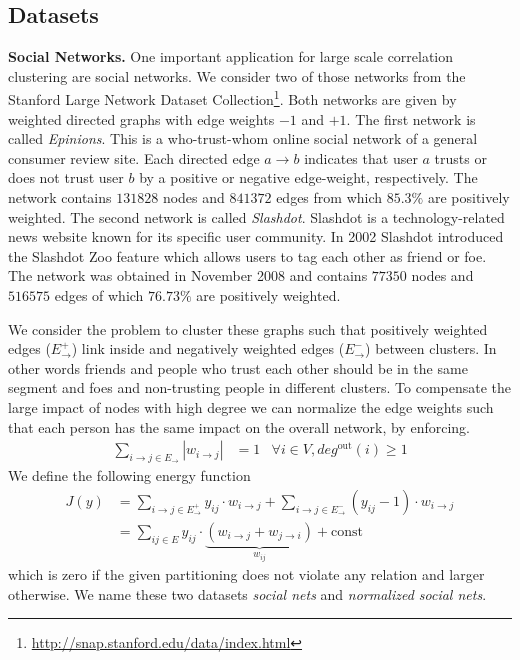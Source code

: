 \subsection{Datasets}\label{sec:datasets}
\textbf{Social Networks.}\label{sec:nets}
One important application for large scale correlation clustering are social networks.
We consider two of those networks from the Stanford Large Network Dataset Collection\footnote{\url{http://snap.stanford.edu/data/index.html}}.
Both networks are given by weighted directed graphs with edge weights $-1$ and $+1$. 
%
The first network is called \emph{Epinions}. 
This is a who-trust-whom online social network of a general consumer review site. 
Each directed edge $a\to b$ indicates that user $a$ trusts  or does not trust user $b$ by a  positive or negative edge-weight, respectively.
The network contains $131828$ nodes and $841372$ edges from which $85.3\%$ are positively weighted.
%
The second network is called \emph{Slashdot}. 
Slashdot is a technology-related news website known for its specific user community. 
In 2002 Slashdot introduced the Slashdot Zoo feature which allows users to tag each other as friend or foe. 
The network was obtained in November 2008 and contains $77350$ nodes and $516575$ edges of which $76.73\%$ are positively weighted.

We consider the problem to cluster these graphs such that positively weighted edges ($E^+_{\to}$) link inside and negatively weighted edges ($E^-_{\to}$) between clusters.
In other words friends and people who trust each other should be in the same segment and foes and non-trusting people in different clusters.
% 
To compensate the large impact of nodes with high degree we can normalize the edge weights such that each person has the same impact on the overall network, by enforcing.
\begin{align}
  \sum_{i\to j \in E_{\to}} |w_{i\to j}| &= 1&\forall i\in V, deg^{\textrm{out}}(i)\geq 1 
\end{align}
We define the following energy function
\begin{align}
 J(y) &= \sum_{i\to j \in E^+_{\to}} y_{ij}\cdot w_{i \to j} +  \sum_{i\to j \in E^-_{\to}} (y_{ij}-1)\cdot w_{i \to j} \nonumber\\
      &= \sum_{ij \in E} y_{ij}\cdot \underbrace{(w_{i \to j}+w_{j \to i})}_{w_{ij}} + \textrm{const}
\end{align}
which is zero if the given partitioning does not violate any relation and larger otherwise.
We name these two datasets \emph{social nets} and \emph{normalized social nets}.

